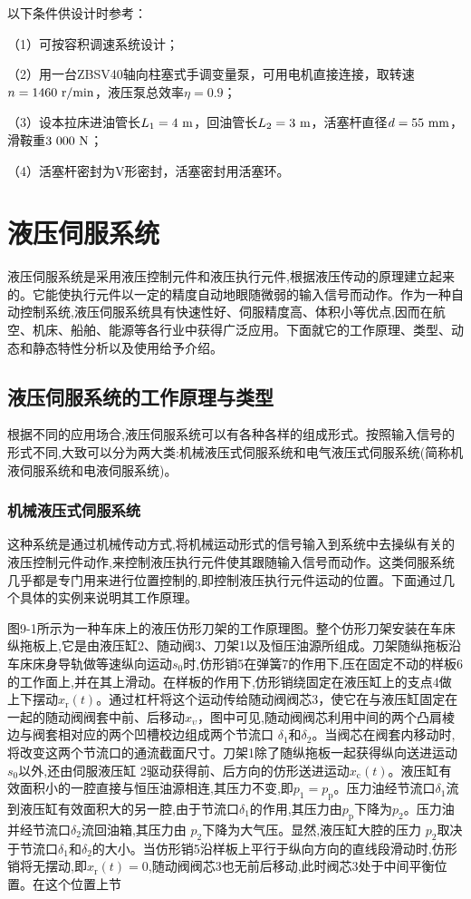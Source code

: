 \documentclass[cn,11pt,chinese]{elegantbook}
\begin{document}
以下条件供设计时参考：

（1）可按容积调速系统设计；

（2）用一台ZBSV40轴向柱塞式手调变量泵，可用电机直接连接，取转速$n=1460\rm \ r/min$，液压泵总效率$\eta=0.9$；

（3）设本拉床进油管长$L_\text{1}=4\ \rm m$，回油管长$L_\text{2}=3\ \rm m$，活塞杆直径$d=55\ \rm mm$，滑鞍重$3\ 000\ \rm N$；

（4）活塞杆密封为V形密封，活塞密封用活塞环。

\chapter{液压伺服系统}

液压伺服系统是采用液压控制元件和液压执行元件,根据液压传动的原理建立起来的。它能使执行元件以一定的精度自动地眼随微弱的输入信号而动作。作为一种自动控制系统,液压伺服系统具有快速性好、伺服精度高、体积小等优点,因而在航空、机床、船舶、能源等各行业中获得广泛应用。下面就它的工作原理、类型、动态和静态特性分析以及使用给予介绍。

\section{液压伺服系统的工作原理与类型}
根据不同的应用场合,液压伺服系统可以有各种各样的组成形式。按照输入信号的形式不同,大致可以分为两大类:机械液压式伺服系统和电气液压式伺服系统(简称机液伺服系统和电液伺服系统)。

\subsection{机械液压式伺服系统}

这种系统是通过机械传动方式,将机械运动形式的信号输入到系统中去操纵有关的液压控制元件动作,来控制液压执行元件使其跟随输入信号而动作。这类伺服系统几乎都是专门用来进行位置控制的,即控制液压执行元件运动的位置。下面通过几个具体的实例来说明其工作原理。

图9-1所示为一种车床上的液压仿形刀架的工作原理图。整个仿形刀架安装在车床纵拖板上,它是由液压缸2、随动阀3、刀架1以及恒压油源所组成。刀架随纵拖板沿车床床身导轨做等速纵向运动$s_\text{0}$时,仿形销5在弹簧7的作用下,压在固定不动的样板6的工作面上,并在其上滑动。在样板的作用下,仿形销绕固定在液压缸上的支点4做上下摆动$x_\text{r}(t)$。通过杠杆将这个运动传给随动阀阀芯3，使它在与液压缸固定在一起的随动阀阀套中前、后移动$x_\upsilon$，图中可见,随动阀阀芯利用中间的两个凸肩棱边与阀套相对应的两个凹槽校边组成两个节流口 $\delta_\text{1}$和$\delta_\text{2}$。当阀芯在阀套内移动时,将改变这两个节流口的通流截面尺寸。刀架1除了随纵拖板一起获得纵向送进运动$s_\text{0}$以外,还由伺服液压缸 2驱动获得前、后方向的仿形送进运动$x_\text{c}(t)$。液压缸有效面积小的一腔直接与恒压油源相连,其压力不变,即$p_\text{1}=p_\text{p}$。压力油经节流口$\delta_\text{1}$流到液压缸有效面积大的另一腔,由于节流口$\delta_\text{1}$的作用,其压力由$p_\text{p}$下降为$p_\text{2}$。压力油并经节流口$\delta_\text{2}$流回油箱,其压力由 $p_\text{2}$下降为大气压。显然,液压缸大腔的压力 $p_\text{2}$取决于节流口$\delta_\text{1}$和$\delta_\text{2}$的大小。当仿形销5沿样板上平行于纵向方向的直线段滑动时,仿形销将无摆动,即$x_\text{r}(t)=0$,随动阀阀芯3也无前后移动,此时阀芯3处于中间平衡位置。在这个位置上节
\end{document}
